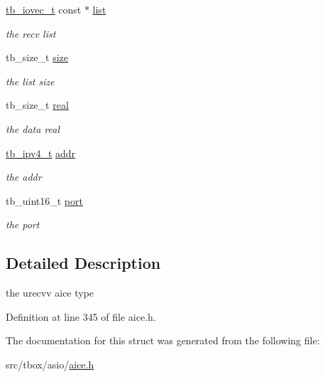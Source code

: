 \begin{DoxyCompactItemize}
\item 
\hypertarget{structtb__aice__urecvv__t_a57f112b6be439de68ff0a3dd8f98a7bf}{\hyperlink{structtb__iovec__t}{tb\-\_\-iovec\-\_\-t} const $\ast$ \hyperlink{structtb__aice__urecvv__t_a57f112b6be439de68ff0a3dd8f98a7bf}{list}}\label{structtb__aice__urecvv__t_a57f112b6be439de68ff0a3dd8f98a7bf}

\begin{DoxyCompactList}\small\item\em the recv list \end{DoxyCompactList}\item 
\hypertarget{structtb__aice__urecvv__t_a5453b95657cef247cbb85b85179f47b4}{tb\-\_\-size\-\_\-t \hyperlink{structtb__aice__urecvv__t_a5453b95657cef247cbb85b85179f47b4}{size}}\label{structtb__aice__urecvv__t_a5453b95657cef247cbb85b85179f47b4}

\begin{DoxyCompactList}\small\item\em the list size \end{DoxyCompactList}\item 
\hypertarget{structtb__aice__urecvv__t_a05bc8b95f83c49c484960dbeb3656510}{tb\-\_\-size\-\_\-t \hyperlink{structtb__aice__urecvv__t_a05bc8b95f83c49c484960dbeb3656510}{real}}\label{structtb__aice__urecvv__t_a05bc8b95f83c49c484960dbeb3656510}

\begin{DoxyCompactList}\small\item\em the data real \end{DoxyCompactList}\item 
\hypertarget{structtb__aice__urecvv__t_ae1e7468622c62034bd74f0f33e2d4f34}{\hyperlink{uniontb__ipv4__t}{tb\-\_\-ipv4\-\_\-t} \hyperlink{structtb__aice__urecvv__t_ae1e7468622c62034bd74f0f33e2d4f34}{addr}}\label{structtb__aice__urecvv__t_ae1e7468622c62034bd74f0f33e2d4f34}

\begin{DoxyCompactList}\small\item\em the addr \end{DoxyCompactList}\item 
\hypertarget{structtb__aice__urecvv__t_a6ec0a25d4896ff293ff1bf2779c5592f}{tb\-\_\-uint16\-\_\-t \hyperlink{structtb__aice__urecvv__t_a6ec0a25d4896ff293ff1bf2779c5592f}{port}}\label{structtb__aice__urecvv__t_a6ec0a25d4896ff293ff1bf2779c5592f}

\begin{DoxyCompactList}\small\item\em the port \end{DoxyCompactList}\end{DoxyCompactItemize}


\subsection{Detailed Description}
the urecvv aice type 

Definition at line 345 of file aice.\-h.



The documentation for this struct was generated from the following file\-:\begin{DoxyCompactItemize}
\item 
src/tbox/asio/\hyperlink{aice_8h}{aice.\-h}\end{DoxyCompactItemize}
